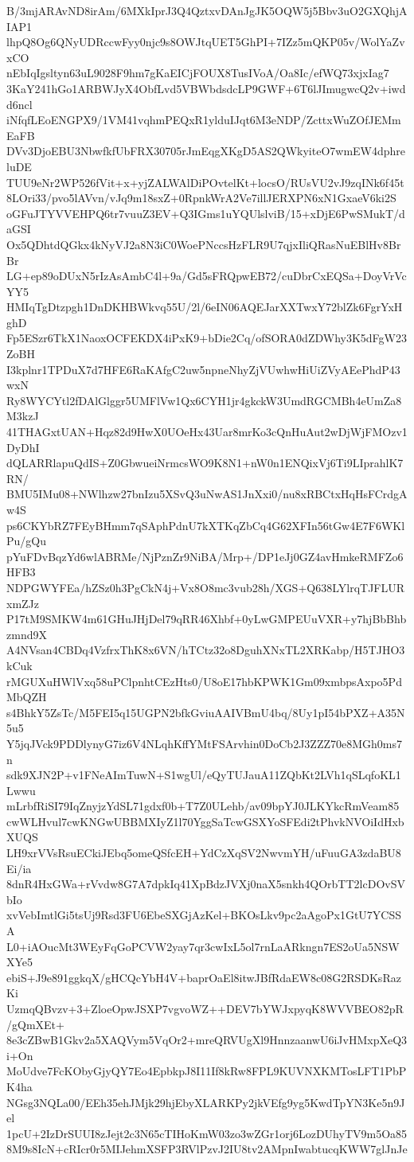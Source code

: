 B/3mjARAvND8irAm/6MXkIprJ3Q4QztxvDAnJgJK5OQW5j5Bbv3uO2GXQhjAIAP1
lhpQ8Og6QNyUDRccwFyy0njc9s8OWJtqUET5GhPI+7IZz5mQKP05v/WolYaZvxCO
nEbIqIgsltyn63uL9028F9hm7gKaEICjFOUX8TusIVoA/Oa8Ic/efWQ73xjxIag7
3KaY241hGo1ARBWJyX4ObfLvd5VBWbdsdcLP9GWF+6T6lJImugwcQ2v+iwdd6ncl
iNfqfLEoENGPX9/1VM41vqhmPEQxR1ylduIJqt6M3eNDP/ZcttxWuZOfJEMmEaFB
DVv3DjoEBU3NbwfkfUbFRX30705rJmEqgXKgD5AS2QWkyiteO7wmEW4dphreluDE
TUU9eNr2WP526fVit+x+yjZALWAlDiPOvtelKt+locsO/RUsVU2vJ9zqINk6f45t
8LOri33/pvo5lAVvn/vJq9m18sxZ+0RpnkWrA2Ve7illJERXPN6xN1GxaeV6ki2S
oGFuJTYVVEHPQ6tr7vuuZ3EV+Q3IGms1uYQUlslviB/15+xDjE6PwSMukT/daGSI
Ox5QDhtdQGkx4kNyVJ2a8N3iC0WoePNccsHzFLR9U7qjxIliQRasNuEBlHv8BrBr
LG+ep89oDUxN5rIzAsAmbC4l+9a/Gd5sFRQpwEB72/cuDbrCxEQSa+DoyVrVcYY5
HMIqTgDtzpgh1DnDKHBWkvq55U/2l/6eIN06AQEJarXXTwxY72blZk6FgrYxHghD
Fp5ESzr6TkX1NaoxOCFEKDX4iPxK9+bDie2Cq/ofSORA0dZDWhy3K5dFgW23ZoBH
I3kplnr1TPDuX7d7HFE6RaKAfgC2uw5npneNhyZjVUwhwHiUiZVyAEePhdP43wxN
Ry8WYCYtl2fDAlGlggr5UMFlVw1Qx6CYH1jr4gkckW3UmdRGCMBh4eUmZa8M3kzJ
41THAGxtUAN+Hqz82d9HwX0UOeHx43Uar8mrKo3cQnHuAut2wDjWjFMOzv1DyDhI
dQLARRlapuQdIS+Z0GbwueiNrmcsWO9K8N1+nW0n1ENQixVj6Ti9LIprahlK7RN/
BMU5IMu08+NWlhzw27bnIzu5XSvQ3uNwAS1JnXxi0/nu8xRBCtxHqHsFCrdgAw4S
ps6CKYbRZ7FEyBHmm7qSAphPdnU7kXTKqZbCq4G62XFIn56tGw4E7F6WKlPu/gQu
pYuFDvBqzYd6wlABRMe/NjPznZr9NiBA/Mrp+/DP1eJj0GZ4avHmkeRMFZo6HFB3
NDPGWYFEa/hZSz0h3PgCkN4j+Vx8O8mc3vub28h/XGS+Q638LYlrqTJFLURxmZJz
P17tM9SMKW4m61GHuJHjDel79qRR46Xhbf+0yLwGMPEUuVXR+y7hjBbBhbzmnd9X
A4NVsan4CBDq4VzfrxThK8x6VN/hTCtz32o8DguhXNxTL2XRKabp/H5TJHO3kCuk
rMGUXuHWlVxq58uPClpnhtCEzHts0/U8oE17hbKPWK1Gm09xmbpsAxpo5PdMbQZH
s4BhkY5ZsTc/M5FEI5q15UGPN2bfkGviuAAIVBmU4bq/8Uy1pI54bPXZ+A35N5u5
Y5jqJVck9PDDlynyG7iz6V4NLqhKffYMtFSArvhin0DoCb2J3ZZZ70e8MGh0ms7n
sdk9XJN2P+v1FNeAImTuwN+S1wgUl/eQyTUJauA11ZQbKt2LVh1qSLqfoKL1Lwwu
mLrbfRiSI79IqZnyjzYdSL71gdxf0b+T7Z0ULehb/av09bpYJ0JLKYkcRmVeam85
cwWLHvul7cwKNGwUBBMXIyZ1l70YggSaTcwGSXYoSFEdi2tPhvkNVOiIdHxbXUQS
LH9xrVVsRsuECkiJEbq5omeQSfcEH+YdCzXqSV2NwvmYH/uFuuGA3zdaBU8Ei/ia
8dnR4HxGWa+rVvdw8G7A7dpkIq41XpBdzJVXj0naX5snkh4QOrbTT2lcDOvSVbIo
xvVebImtlGi5tsUj9Rsd3FU6EbeSXGjAzKel+BKOsLkv9pc2aAgoPx1GtU7YCSSA
L0+iAOucMt3WEyFqGoPCVW2yay7qr3cwIxL5ol7rnLaARkngn7ES2oUa5NSWXYe5
ebiS+J9e891ggkqX/gHCQcYbH4V+baprOaEl8itwJBfRdaEW8c08G2RSDKsRazKi
UzmqQBvzv+3+ZloeOpwJSXP7vgvoWZ++DEV7bYWJxpyqK8WVVBEO82pR/gQmXEt+
8e3cZBwB1Gkv2a5XAQVym5VqOr2+mreQRVUgXl9HnnzaanwU6iJvHMxpXeQ3i+On
MoUdve7FcKObyGjyQY7Eo4EpbkpJ8I11If8kRw8FPL9KUVNXKMTosLFT1PbPK4ha
NGsg3NQLa00/EEh35ehJMjk29hjEbyXLARKPy2jkVEfg9yg5KwdTpYN3Ke5n9Jel
1pcU+2IzDrSUUI8zJejt2c3N65cTIHoKmW03zo3wZGr1orj6LozDUhyTV9m5Oa85
8M9s8IcN+cRIcr0r5MIJehmXSFP3RVlPzvJ2IU8tv2AMpnIwabtucqKWW7glJnJe
